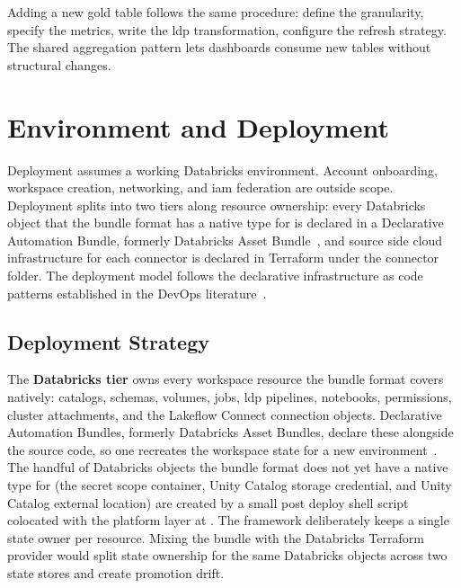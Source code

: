 Adding a new gold table follows the same procedure: define the granularity, specify the metrics, write the \gls{ldp} transformation, configure the refresh strategy. The shared aggregation pattern lets dashboards consume new tables without structural changes.


\section{Environment and Deployment}

Deployment assumes a working Databricks environment. Account onboarding, workspace creation, networking, and \gls{iam} federation are outside scope. Deployment splits into two tiers along resource ownership: every Databricks object that the bundle format has a native type for is declared in a Declarative Automation Bundle, formerly Databricks Asset Bundle~\cite{DatabricksDAB2026}, and source side cloud infrastructure for each connector is declared in Terraform under the connector folder. The deployment model follows the declarative infrastructure as code patterns established in the DevOps literature~\parencite{Forsgren2018, Kim2021}.


\subsection{Deployment Strategy}
\label{sec:deployment-strategy}

The \textbf{Databricks tier} owns every workspace resource the bundle format covers natively: catalogs, schemas, volumes, jobs, \gls{ldp} pipelines, notebooks, permissions, cluster attachments, and the Lakeflow Connect connection objects. Declarative Automation Bundles, formerly Databricks Asset Bundles, declare these alongside the source code, so one  recreates the workspace state for a new environment~\cite{DatabricksDAB2026}. The handful of Databricks objects the bundle format does not yet have a native type for (the secret scope container, Unity Catalog storage credential, and Unity Catalog external location) are created by a small post deploy shell script colocated with the platform layer at . The framework deliberately keeps a single state owner per resource. Mixing the bundle with the Databricks Terraform provider would split state ownership for the same Databricks objects across two state stores and create promotion drift.

